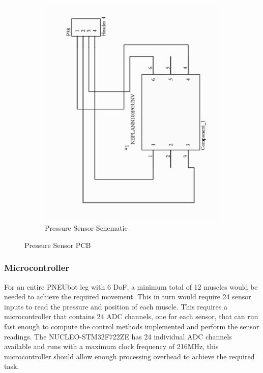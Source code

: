 \documentclass[11pt,a4paper]{article}
\begin{document}
\begin{figure}[!hbt]
\begin{subfigure}[t]{0.45 \textwidth}
        \includegraphics[angle=270, origin=c, clip, trim=0cm 0cm 0cm 0cm, width=1.00\textwidth]{PressureSensorSCH_crop.pdf}
        \caption{Pressure Sensor Schematic}
        \label{fig:pres_sense_sch}
    \end{subfigure}
    \caption{Pressure Sensor PCB}
    \label{fig:pres_sense}
\end{figure}

\subsubsection{Microcontroller}
\label{sub:microcontroller}

For an entire PNEUbot leg with 6 DoF, a minimum total of 12 muscles would be needed to achieve the required movement. This in turn would require 24 sensor inputs to read the pressure and position of each muscle. This requires a microcontroller that contains 24 ADC channels, one for each sensor, that can run fast enough to compute the control methods implemented and perform the sensor readings. The NUCLEO-STM32F722ZE \cite{nucleo_stm32f722ze} has 24 individual ADC channels available and runs with a maximum clock frequency of 216MHz, this microcontroller should allow enough processing overhead to achieve the required task.
\end{document}
